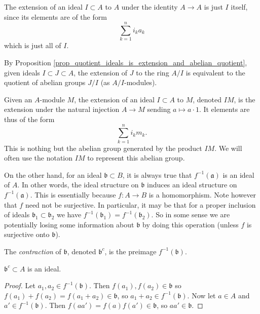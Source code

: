\documentclass[12pt]{article}
\begin{document}
\begin{example}
	The extension of an ideal $I\subset A$ to $A$ under the identity $A\to A$ is just $I$ itself, since its elements are of the form 
	\begin{equation*}
		\sum_{k=1}^n i_ka_k
	\end{equation*}
	which is just all of $I$.

	By Proposition \ref{prop_quotient_ideals_is_extension_and_abelian_quotient}, given ideals $I\subset J\subset A$, the extension of $J$ to the ring $A/I$ is equivalent to the quotient of abelian groups $J/I$ (as $A/I$-modules).

	Given an $A$-module $M$, the extension of an ideal $I\subset A$ to $M$, denoted $IM$, is the extension under the natural injection $A\to M$ sending $a\mapsto a\cdot 1$. It elements are thus of the form 
	\begin{equation*}
		\sum_{k=1}^n i_km_k.
	\end{equation*}
	This is nothing but the abelian group generated by the product $IM$. We will often use the notation $IM$ to represent this abelian group.
\end{example}

On the other hand, for an ideal $\mathfrak{b}\subset B$, it is always true that $f^{-1}(\mathfrak{a})$ is an ideal of $A$. In other words, the ideal structure on $\mathfrak{b}$ induces an ideal structure on $f^{-1}(\mathfrak{a})$. This is essentially because $f:A\to B$ is a homomorphism. Note however that $f$ need not be surjective. In particular, it may be that for a proper inclusion of ideals $\mathfrak{b}_1\subset\mathfrak{b}_2$ we have $f^{-1}(\mathfrak{b_1})=f^{-1}(\mathfrak{b}_2)$. So in some sense we are potentially losing some information about $\mathfrak{b}$ by doing this operation (unless $f$ is surjective onto $\mathfrak{b}$).

\begin{definition}
	The \emph{contraction} of $\mathfrak{b}$, denoted $\mathfrak{b}^c$, is the preimage $f^{-1}(\mathfrak{b})$. 
\end{definition}

\begin{proposition}
\label{prop_contraction_is_ideal}
	$\mathfrak{b}^c\subset A$ is an ideal.
\end{proposition}
\begin{proof}
	Let $a_1, a_2\in f^{-1}(\mathfrak{b})$. Then $f(a_1), f(a_2)\in\mathfrak{b}$ so $f(a_1) + f(a_2) = f(a_1 + a_2) \in \mathfrak{b}$, so $a_1 + a_2 \in f^{-1}(\mathfrak{b})$. Now let $a\in A$ and $a'\in f^{-1}(\mathfrak{b})$. Then $f(aa') = f(a)f(a') \in \mathfrak{b}$, so $aa'\in\mathfrak{b}$. 
\end{proof}
\end{document}
